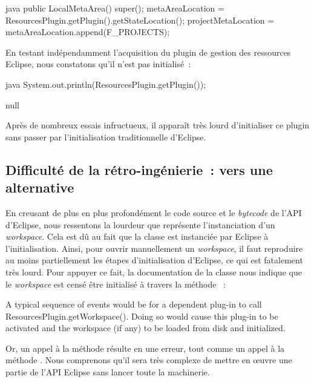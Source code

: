 \begin{imtaCode}{java}
public LocalMetaArea() {
    super();
    metaAreaLocation = ResourcesPlugin.getPlugin().getStateLocation();
    projectMetaLocation = metaAreaLocation.append(F_PROJECTS);
}
\end{imtaCode}

En testant indépendamment l'acquisition du plugin de gestion des ressources Eclipse, nous constatons qu'il n'est pas initialisé~:

\begin{imtaCode}{java}
System.out.println(ResourcesPlugin.getPlugin());
\end{imtaCode}
\vspace{-0.5cm}
\begin{imtaConsole}
null
\end{imtaConsole}

Après de nombreux essais infructueux, il apparaît très lourd d'initialiser ce plugin sans passer par l'initialisation traditionnelle d'Eclipse.


\subsection{Difficulté de la rétro-ingénierie~: vers une alternative}

En creusant de plus en plus profondément le code source et le \textit{bytecode} de l'API d'Eclipse, nous ressentons la lourdeur que représente l'instanciation d'un \textit{workspace}.
Cela est dû au fait que la classe  est instanciée par Eclipse à l'initialisation.
Ainsi, pour ouvrir manuellement un \textit{workspace}, il faut reproduire au moins partiellement les étapes d'initialisation d'Eclipse, ce qui est fatalement très lourd.
Pour appuyer ce fait, la documentation de la classe  \cite{eclipseresourcesplugin} nous indique que le \textit{workspace} est censé être initialisé à travers la méthode %
~:\\

\begin{imtaQuote}
A typical sequence of events would be for a dependent plug-in to call\\ResourcesPlugin.getWorkspace().
Doing so would cause this plug-in to be activated and the workspace (if any) to be loaded from disk and initialized.
\end{imtaQuote}

Or, un appel à la méthode  résulte en une erreur, tout comme un appel à la méthode .
Nous comprenons qu'il sera très complexe de mettre en œuvre une partie de l'API Eclipse sans lancer toute la machinerie.

